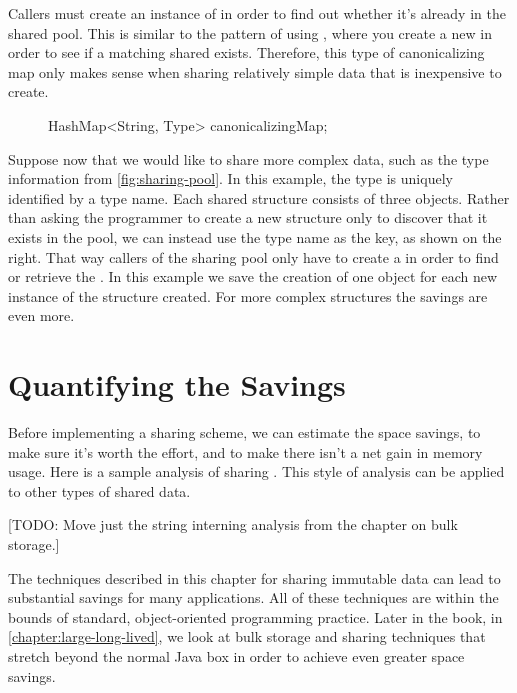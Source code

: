 Callers must create an instance of  in order
to find out whether it's already in the shared pool. This
is similar to the pattern of using , where you create a new
 in order to see if a matching shared  exists. Therefore, this type
of canonicalizing map only makes sense when sharing relatively simple data
that is inexpensive to create.

\begin{figure}
\centering
\begin{framedlisting}
HashMap<String, Type> canonicalizingMap;
\end{framedlisting}
\end{figure}

Suppose now that we would like to share more complex data, such as the type
information from \autoref{fig:sharing-pool}. In this example, the type is
uniquely identified by a  type name. Each shared structure
consists of three objects. Rather than asking the programmer to create a new  structure only to discover
that it exists in the pool, we can instead use the type name as the key, as
shown on the right. That way callers of the sharing pool only have to create a
 in order to find or retrieve the . In this example we save the creation of
one object for each new instance of the structure created.  For more complex structures the savings
are even more. 




\section{Quantifying the Savings}
\label{sec:quantifying-sharing-savings}

Before implementing a sharing scheme, we can estimate the
space savings, to make sure it's worth the effort, and to make there isn't a
net gain in memory usage.  Here is a sample analysis of sharing .
This style of analysis can be applied to other types of shared data.

[TODO: Move just the string interning analysis from the chapter on
bulk storage.]

The techniques described in this chapter for sharing immutable
data can lead to substantial savings for many applications.  All of these
techniques are within the bounds of standard, object-oriented programming
practice. Later in the book, in \autoref{chapter:large-long-lived}, we look at
bulk storage and sharing techniques that stretch beyond the normal Java box in
order to achieve even greater space savings. 


